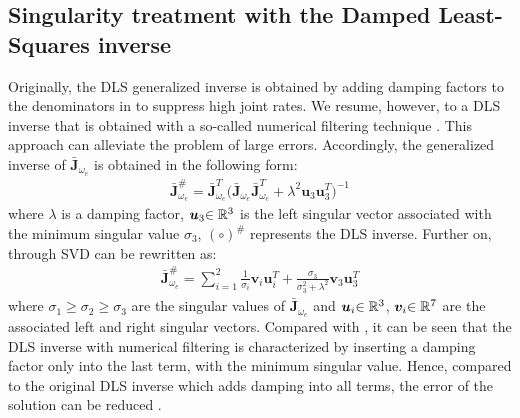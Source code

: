 \subsection{Singularity treatment with the Damped Least-Squares inverse}
\label{sec:SIN_DLS}
Originally, the DLS generalized inverse is obtained by  adding damping factors to the  denominators
in  to suppress high  joint rates.  We resume, however, to a DLS inverse that 
is obtained with a so-called  numerical filtering technique \cite{Chiaverini1997}. This approach can alleviate  
the problem of large errors. Accordingly, 
the generalized inverse of $\bar{\bm{J}}_{\omega_{e}}$ is obtained in the following form:
%
\begin{align}
  \bar{\bm{J}}_{\omega_{e}}^{\#} = \bar{\bm{J}}_{\omega_{e}}^{T}\Big(\bar{\bm{J}}_{\omega_{e}}\bar{\bm{J}}_{\omega_{e}}^{T} +
  \lambda^{2}\bm{u}_{3}\bm{u}_{3}^{T}\Big)^{-1}\label{eq:INV_DAMPED}
\end{align}
%
where  $\lambda$ is a damping factor,
$\bm{u}_{3}{\in\mathbb{R}^{3}}$ is the left singular vector associated with the minimum singular value $\sigma_{3}$,
$(\circ)^{\#}$ represents the DLS inverse. 
Further on, through SVD  can be rewritten as:
%
\begin{align}
  \bar{\bm{J}}_{\omega_{e}}^{\#} = \sum_{i = 1}^{2}\frac{1}{\sigma_{i}}\bm{v}_{i}\bm{u}_{i}^{T} +
  \frac{\sigma_{3}}{\sigma_{3}^{2} + \lambda^{2}}\bm{v}_{3}\bm{u}_{3}^{T}\label{eq:INV_SVD}
\end{align}
%
where $\sigma_{1} \geq \sigma_{2} \geq \sigma_{3}$ are the singular values of $\bar{\bm{J}}_{\omega_{e}}$ and
$\bm{u}_{i}{\in\mathbb{R}^{3}}$, $\bm{v}_{i}{\in\mathbb{R}^{7}}$ are the associated left and right singular vectors.
Compared with , it can be seen that the DLS inverse with numerical filtering
is characterized by inserting  a damping factor  only into the last term, with the 
minimum singular value. Hence, compared to the original DLS inverse
which adds damping into all terms, the error of the solution can be reduced \cite{Chiaverini1997}.
%
